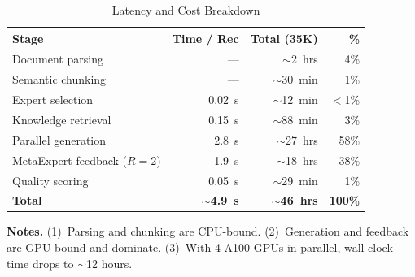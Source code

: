 \documentclass[sigconf,nonacm]{acmart}
\begin{document}
\begin{table}[h]
\centering
\caption{Latency and Cost Breakdown}
\label{tab:latency}
\small
\begin{tabular}{@{}lrrr@{}}
\toprule
\textbf{Stage} & \textbf{Time / Rec} & \textbf{Total (35K)} & \textbf{\%} \\
\midrule
Document parsing & --- & $\sim$2~hrs & 4\% \\
Semantic chunking & --- & $\sim$30~min & 1\% \\
Expert selection & 0.02~s & $\sim$12~min & $<$1\% \\
Knowledge retrieval & 0.15~s & $\sim$88~min & 3\% \\
Parallel generation & 2.8~s & $\sim$27~hrs & 58\% \\
MetaExpert feedback ($R=2$) & 1.9~s & $\sim$18~hrs & 38\% \\
Quality scoring & 0.05~s & $\sim$29~min & 1\% \\
\midrule
\textbf{Total} & \textbf{$\sim$4.9~s} & \textbf{$\sim$46~hrs} & \textbf{100\%} \\
\bottomrule
\end{tabular}
\end{table}

\noindent\textbf{Notes.} (1)~Parsing and chunking are CPU-bound. (2)~Generation and feedback are GPU-bound and dominate. (3)~With 4 A100 GPUs in parallel, wall-clock time drops to $\sim$12 hours.
\end{document}
